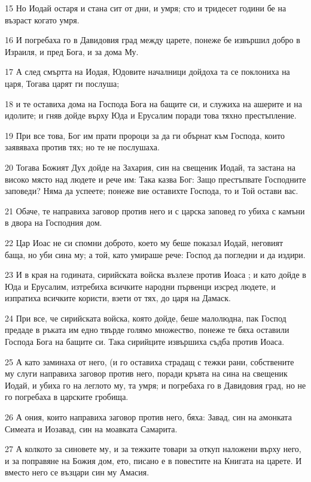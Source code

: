 \par 15 Но Иодай остаря и стана сит от дни, и умря; сто и тридесет години бе на възраст когато умря.
\par 16 И погребаха го в Давидовия град между царете, понеже бе извършил добро в Израиля, и пред Бога, и за дома Му.
\par 17 А след смъртта на Иодая, Юдовите началници дойдоха та се поклониха на царя, Тогава царят ги послуша;
\par 18 и те оставиха дома на Господа Бога на бащите си, и служиха на ашерите и на идолите; и гняв дойде върху Юда и Ерусалим поради това тяхно престъпление.
\par 19 При все това, Бог им прати пророци за да ги обърнат към Господа, които заявяваха против тях; но те не послушаха.
\par 20 Тогава Божият Дух дойде на Захария, син на свещеник Иодай, та застана на високо място над людете и рече им: Така казва Бог: Защо престъпвате Господните заповеди? Няма да успеете; понеже вие оставихте Господа, то и Той остави вас.
\par 21 Обаче, те направиха заговор против него и с царска заповед го убиха с камъни в двора на Господния дом.
\par 22 Цар Иоас не си спомни доброто, което му беше показал Иодай, неговият баща, но уби сина му; а той, като умираше рече: Господ да погледни и да издири.
\par 23 И в края на годината, сирийската войска възлезе против Иоаса ; и като дойде в Юда и Ерусалим, изтребиха всичките народни първенци изсред людете, и изпратиха всичките користи, взети от тях, до царя на Дамаск.
\par 24 При все, че сирийската войска, която дойде, беше малолюдна, пак Господ предаде в ръката им едно твърде голямо множество, понеже те бяха оставили Господа Бога на бащите си. Така сирийците извършиха съдба против Иоаса.
\par 25 А като заминаха от него, (и го оставиха страдащ с тежки рани, собствените му слуги направиха заговор против него, поради кръвта на сина на свещеник Иодай, и убиха го на леглото му, та умря; и погребаха го в Давидовия град, но не го погребаха в царските гробища.
\par 26 А ония, които направиха заговор против него, бяха: Завад, син на амонката Симеата и Иозавад, син на моавката Самарита.
\par 27 А колкото за синовете му, и за тежките товари за откуп наложени върху него, и за поправяне на Божия дом, ето, писано е в повестите на Книгата на царете. И вместо него се възцари син му Амасия.

